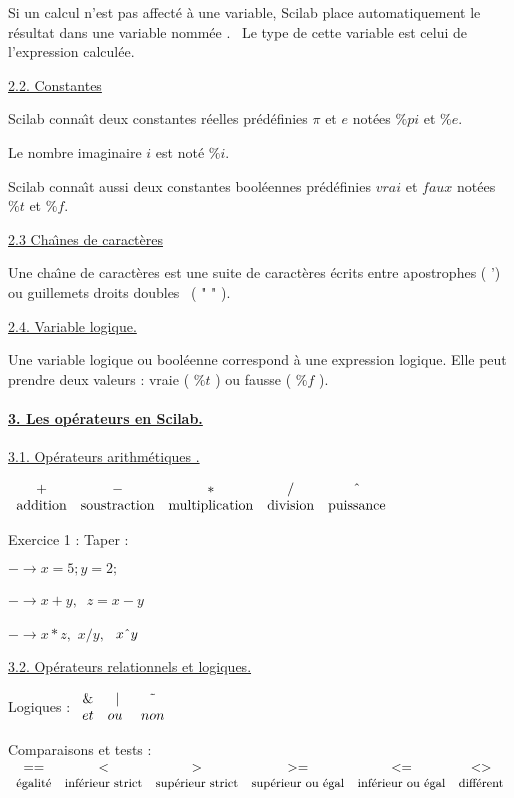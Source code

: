 \documentclass{article}
\begin{document}
Si un calcul n'est pas affect\'{e} \`{a} une variable, Scilab place
automatiquement le r\'{e}sultat dans une variable nomm\'{e}e . \
Le type de cette variable est celui de l'expression calcul\'{e}e.

\underline{2.2. Constantes}

Scilab conna\^{\i}t deux constantes r\'{e}elles pr\'{e}d\'{e}finies $\pi $
et $e$ not\'{e}es $\%pi$ et $\%e.$

Le nombre imaginaire $i$ est not\'{e} $\%i$.

Scilab conna\^{\i}t aussi deux constantes bool\'{e}ennes pr\'{e}d\'{e}finies 
$vrai$ et $faux$ not\'{e}es $\%t$ et $\%f.$

\underline{2.3 Cha\^{\i}nes de caract\`{e}res }

Une cha\^{\i}ne de caract\`{e}res est une suite de caract\`{e}res \'{e}crits
entre apostrophes ( ') ou guillemets droits doubles \ ( " " ).

\underline{2.4. Variable logique.}

Une variable logique ou bool\'{e}enne correspond \`{a} une expression
logique. Elle peut prendre deux valeurs : vraie ( $\%t$ ) ou fausse ( $\%f$
).

\paragraph{\protect\underline{3. Les op\'{e}rateurs en Scilab.}}

\underline{3.1. Op\'{e}rateurs arithm\'{e}tiques .}

$%
\begin{array}{ccccc}
+ & - & \ast & / & \symbol{94} \\ 
\text{addition} & \text{soustraction} & \text{multiplication} & \text{%
division} & \text{puissance}%
\end{array}%
$

Exercice 1 : Taper :

$-\rightarrow x=5;y=2;$

$-\rightarrow x+y,$ $\ z=x-y$

$-\rightarrow x\ast z,$ $x/y,$ $\ x\symbol{94}y$

\underline{3.2. Op\'{e}rateurs relationnels et logiques.}

Logiques : $%
\begin{array}{ccc}
\& & | & \symbol{126} \\ 
et & ou\text{ } & non%
\end{array}%
$

Comparaisons et tests : $%
\begin{array}{cccccc}
== & < & > & >= & <= & <> \\ 
\text{{\small \'{e}galit\'{e}}} & \text{{\small inf\'{e}rieur strict}} & 
\text{{\small sup\'{e}rieur strict}} & \text{{\small sup\'{e}rieur ou \'{e}%
gal}} & \text{{\small inf\'{e}rieur ou \'{e}gal}} & \text{{\small diff\'{e}%
rent}}%
\end{array}%
$
\end{document}
